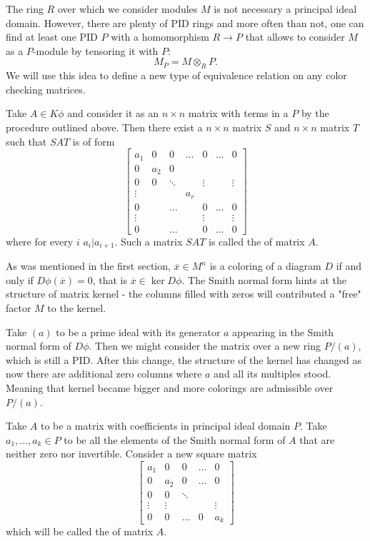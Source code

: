 The ring $R$ over which we consider modules $M$ is not necessary a principal ideal domain. However, there are plenty of PID rings and more often than not, one can find at least one PID $P$ with a homomorphism $R\to P$ that allows to consider $M$ as a $P$-module by tensoring it with $P$:
$$M_P=M\otimes_R P.$$
We will use this idea to define a new type of equivalence relation on any color checking matrices.

\begin{definition}
Take $A\in K\phi$ and consider it as an $n\times n$ matrix with terms in a $P$ by the procedure outlined above. Then there exist a $n\times n$ matrix $S$ and $n\times n$ matrix $T$ such that $SAT$ is of form
$$
\begin{bmatrix}
  a_1 & 0 & 0 & \hdots & 0 & \hdots & 0 \\ 
  0 & a_2 & 0\\ 
  0 & 0 & \ddots & & \vdots & & \vdots\\ 
  \vdots & & & a_r\\ 
  0 & & \hdots & & 0 & \hdots & 0 \\ 
  \vdots & & & & \vdots & & \vdots\\ 
  0 & & \hdots & & 0 & \hdots & 0
\end{bmatrix}
$$
where for every $i$ $a_i|a_{i+1}$. Such a matrix $SAT$ is called the  of matrix $A$.
\end{definition}

As was mentioned in the first section, $\overline{x}\in M^n$ is a coloring of a diagram $D$ if and only if $D\phi(\overline{x})=0$, that is $\overline{x}\in\ker D\phi$. The Smith normal form hints at the structure of matrix kernel - the columns filled with zeros will contributed a "free" factor $M$ to the kernel. 

Take $(a)$ to be a prime ideal with its generator $a$ appearing in the Smith normal form of $D\phi$. Then we might consider the matrix over a new ring $P/(a)$, which is still a PID. After this change, the structure of the kernel has changed as now there are additional zero columns where $a$ and all its multiples stood. Meaning that kernel became bigger and more colorings are admissible over $P/(a)$.

\begin{definition}
  Take $A$ to be a matrix with coefficients in principal ideal domain $P$. Take $a_1,...,a_k\in P$ to be all the elements of the Smith normal form of $A$ that are neither zero nor invertible. Consider a new square matrix 
  $$
  \begin{bmatrix}
    a_1 & 0 & 0 & \hdots & 0\\ 
    0 & a_2 & 0 & \hdots & 0 \\ 
    0 & 0 & \ddots & &  \\ 
    \vdots & \vdots & & & \vdots \\ 
    0 & 0 & \hdots & 0 & a_k
  \end{bmatrix}
  $$
  which will be called the  of matrix $A$.
\end{definition}

